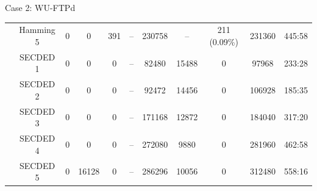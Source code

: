 \begin{frame}[noframenumbering]{Case 2: WU-FTPd}
\begin{table}[H]
\begin{tabular}{@{}ccccccccccc@{}}
                                                             & Hamming 5     & 0     & 0           & 391        & --          & \num{230758}                             & --                                      & 211  {\tiny (0.09\%)}       & \num{231360} & 445:58                                  \\
                                                             & SECDED 1      & 0     & 0           & 0          & --          & \num{82480 }                             & \num{15488}                             & 0                           & \num{97968 } & 233:28                                  \\
                                                             & SECDED 2      & 0     & 0           & 0          & --          & \num{92472 }                             & \num{14456}                             & 0                           & \num{106928} & 185:35                                  \\
                                                             & SECDED 3      & 0     & 0           & 0          & --          & \num{171168}                             & \num{12872}                             & 0                           & \num{184040} & 317:20                                  \\
                                                             & SECDED 4      & 0     & 0           & 0          & --          & \num{272080}                             & \num{9880 }                             & 0                           & \num{281960} & 462:58                                  \\
                                                             & SECDED 5      & 0     & \num{16128} & 0          & --          & \num{286296}                             & \num{10056}                             & 0                           & \num{312480} & 558:16                                  \\
            \bottomrule
        \end{tabular}
    \end{table}
\end{frame}

